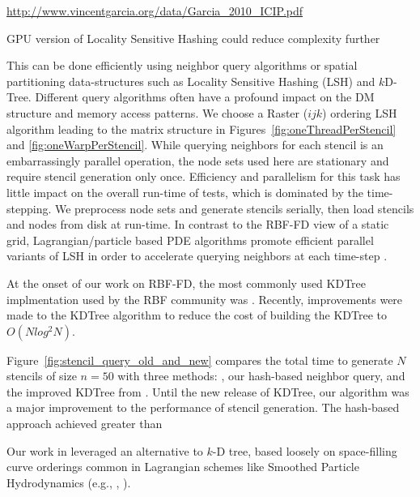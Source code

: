 \documentclass{report}
\begin{document}
\url{http://www.vincentgarcia.org/data/Garcia_2010_ICIP.pdf}

GPU version of Locality Sensitive Hashing could reduce complexity further \cite{Pan2011}

This can be done efficiently using neighbor query algorithms or spatial partitioning data-structures such as Locality Sensitive Hashing (LSH) and $k$D-Tree. Different query algorithms often have a profound impact on the DM structure and memory access patterns. We choose a Raster ($ijk$) ordering LSH algorithm \cite{Bollig2011} leading to the matrix structure in Figures~\ref{fig:oneThreadPerStencil} and \ref{fig:oneWarpPerStencil}. While querying neighbors for each stencil is an embarrassingly parallel operation, the node sets used here are stationary and require stencil generation only once. Efficiency and parallelism for this task has little impact on the overall run-time of tests, which is dominated by the time-stepping. We preprocess node sets and generate stencils serially, then load stencils and nodes from disk at run-time. In contrast to the RBF-FD view of a static grid, Lagrangian/particle based PDE algorithms promote efficient parallel variants of LSH in order to accelerate querying neighbors at each time-step \cite{Pan2011, Goswami2010}. 


At the onset of our work on RBF-FD, the most commonly used KDTree implmentation used by the RBF community was \cite{Tagliasacchi2008}. Recently, improvements were made to the KDTree algorithm to reduce the cost of building the KDTree to $O(N log^2 N)$. 

Figure~\ref{fig:stencil_query_old_and_new} compares the total time to generate $N$ stencils of size $n=50$ with three methods: \cite{Tagliasacchi2008}, our hash-based neighbor query, and the improved KDTree from \cite{Tagliasacchi2012}. 
Until the new release of KDTree, our algorithm was a major improvement to the performance of stencil generation. The hash-based approach achieved greater than 


Our work in \cite{BolligFlyerErlebacher2012} leveraged an alternative to $k$-D tree, based loosely on space-filling curve orderings common in Lagrangian schemes like Smoothed Particle Hydrodynamics (e.g., \cite{IanThesis}, \cite{Kelager}). %
\end{document}
